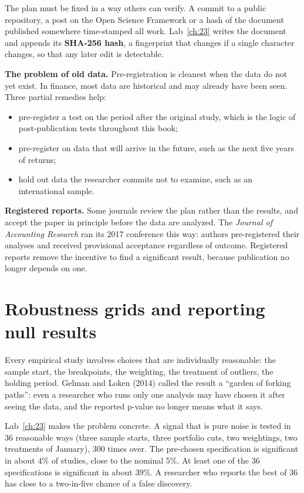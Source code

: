 The plan must be fixed in a way others can verify. A commit to a public repository, a post on the Open Science Framework or a hash of the document published somewhere time-stamped all work. Lab~\ref{ch:23} writes the document and appends its \textbf{SHA-256 hash}, a fingerprint that changes if a single character changes, so that any later edit is detectable.

\textbf{The problem of old data.} Pre-registration is cleanest when the data do not yet exist. In finance, most data are historical and may already have been seen. Three partial remedies help:

\begin{itemize}
  \item pre-register a test on the period after the original study, which is the logic of post-publication tests throughout this book;
  \item pre-register on data that will arrive in the future, such as the next five years of returns;
  \item hold out data the researcher commits not to examine, such as an international sample.
\end{itemize}

\textbf{Registered reports.} Some journals review the plan rather than the results, and accept the paper in principle before the data are analyzed. The \emph{Journal of Accounting Research} ran its 2017 conference this way: authors pre-registered their analyses and received provisional acceptance regardless of outcome. Registered reports remove the incentive to find a significant result, because publication no longer depends on one.

\section{Robustness grids and reporting null results}
\label{sec:24-robust}

Every empirical study involves choices that are individually reasonable: the sample start, the breakpoints, the weighting, the treatment of outliers, the holding period. Gelman and Loken (2014) called the result a ``garden of forking paths'': even a researcher who runs only one analysis may have chosen it after seeing the data, and the reported p-value no longer means what it says.

Lab~\ref{ch:23} makes the problem concrete. A signal that is pure noise is tested in 36 reasonable ways (three sample starts, three portfolio cuts, two weightings, two treatments of January), 300 times over. The pre-chosen specification is significant in about 4\% of studies, close to the nominal 5\%. At least one of the 36 specifications is significant in about 39\%. A researcher who reports the best of 36 has close to a two-in-five chance of a false discovery.

